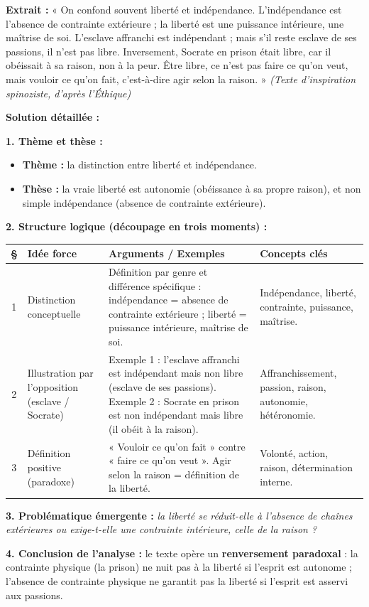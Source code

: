 \documentclass[11pt]{article}
\begin{document}
\begin{exoresolu}
\textbf{Extrait :} « On confond souvent liberté et indépendance. L'indépendance est l'absence de contrainte extérieure ; la liberté est une puissance intérieure, une maîtrise de soi. L'esclave affranchi est indépendant ; mais s'il reste esclave de ses passions, il n'est pas libre. Inversement, Socrate en prison était libre, car il obéissait à sa raison, non à la peur. Être libre, ce n'est pas faire ce qu'on veut, mais vouloir ce qu'on fait, c'est-à-dire agir selon la raison. » \emph{(Texte d'inspiration spinoziste, d'après l'\emph{Éthique})}

\tcblower
\textbf{Solution détaillée :}

\noindent \textbf{1. Thème et thèse :}
\begin{itemize}
    \item \textbf{Thème :} la distinction entre liberté et indépendance.
    \item \textbf{Thèse :} la vraie liberté est autonomie (obéissance à sa propre raison), et non simple indépendance (absence de contrainte extérieure).
\end{itemize}

\noindent \textbf{2. Structure logique (découpage en trois moments) :}
\begin{center}
\begin{tabularx}{\linewidth}{|c|X|X|X|}\hline
\textbf{§} & \textbf{Idée force} & \textbf{Arguments / Exemples} & \textbf{Concepts clés} \\ \hline
1 & Distinction conceptuelle & Définition par genre et différence spécifique : indépendance = absence de contrainte extérieure ; liberté = puissance intérieure, maîtrise de soi. & Indépendance, liberté, contrainte, puissance, maîtrise. \\ \hline
2 & Illustration par l'opposition (esclave / Socrate) & Exemple 1 : l'esclave affranchi est indépendant mais non libre (esclave de ses passions). Exemple 2 : Socrate en prison est non indépendant mais libre (il obéit à la raison). & Affranchissement, passion, raison, autonomie, hétéronomie. \\ \hline
3 & Définition positive (paradoxe) & « Vouloir ce qu'on fait » contre « faire ce qu'on veut ». Agir selon la raison = définition de la liberté. & Volonté, action, raison, détermination interne. \\ \hline
\end{tabularx}
\end{center}

\noindent \textbf{3. Problématique émergente :} \emph{la liberté se réduit-elle à l'absence de chaînes extérieures ou exige-t-elle une contrainte intérieure, celle de la raison ?}

\noindent \textbf{4. Conclusion de l'analyse :} le texte opère un \textbf{renversement paradoxal} : la contrainte physique (la prison) ne nuit pas à la liberté si l'esprit est autonome ; l'absence de contrainte physique ne garantit pas la liberté si l'esprit est asservi aux passions.
\end{exoresolu}
\end{document}
